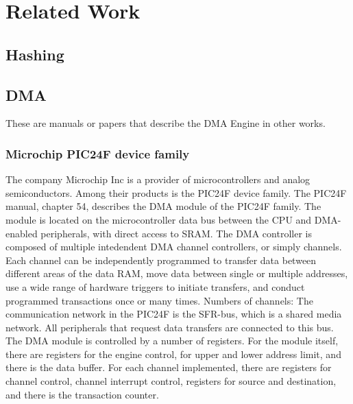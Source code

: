 \chapter{Related Work}
\section{Hashing}
\section{DMA}
These are manuals or papers that describe the DMA Engine in other works.
\subsection{Microchip PIC24F device family}
The company Microchip Inc is a provider of microcontrollers and analog semiconductors.
Among their products is the PIC24F device family. 
The PIC24F manual,  chapter 54, describes the DMA module of the PIC24F family.
The module is located on the microcontroller data bus between the CPU and DMA-enabled peripherals, with direct access to SRAM.
The DMA controller is composed of multiple intedendent DMA channel controllers, or simply channels.
Each channel can be independently programmed to transfer data between different areas of the data RAM, move data between single or multiple addresses, use a wide range of hardware triggers to initiate transfers, and conduct programmed transactions once or many times. 
Numbers of channels: 
The communication network in the PIC24F is the SFR-bus, which is a shared media network.
All peripherals that request data transfers are connected to this bus.
The DMA module is controlled by a number of registers.
For the module itself, there are registers for the engine control, for upper and lower address limit, and there is the data buffer.
For each channel implemented, there are registers for channel control, channel interrupt control, registers for source and destination, and there is the transaction counter. 

